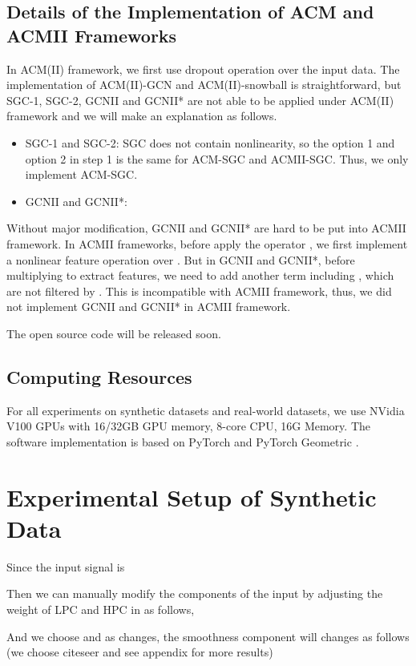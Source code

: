 \documentclass{article}
\newcommand{\0}{{\boldsymbol{0}}}
\newcommand{\6}{{\partial}}
\newcommand{\8}{{\infty}}
\newcommand{\4}{{\nabla}}
\begin{document}
\subsection{Details of the Implementation of ACM and ACMII Frameworks}
\label{appendix:details_implementation_acm_acmII}
In ACM(II) framework, we first use dropout operation over the input data. The implementation of ACM(II)-GCN and ACM(II)-snowball is straightforward, but SGC-1, SGC-2, GCNII and GCNII* are not able to be applied under ACM(II) framework and we will make an explanation as follows.
\begin{itemize}
    \item SGC-1 and SGC-2: SGC does not contain nonlinearity, so the option 1 and option 2 in step 1 is the same for ACM-SGC and ACMII-SGC. Thus, we only implement ACM-SGC.
    \item GCNII and GCNII*: 
    
\end{itemize}
Without major modification, GCNII and GCNII* are hard to be put into ACMII framework. In ACMII frameworks, before apply the operator , we first implement a nonlinear feature operation over . But in GCNII and GCNII*, before multiplying  to extract features, we need to add another term including , which are not filtered by . This is incompatible with ACMII framework, thus, we did not implement GCNII and GCNII* in ACMII framework. 

The open source code will be released soon.

\subsection{Computing Resources}
For all experiments on synthetic datasets and real-world datasets, we use NVidia V100 GPUs with 16/32GB GPU memory, 8-core CPU, 16G Memory. The
software implementation is based on PyTorch and PyTorch Geometric \cite{fey2019fast}.
\clearpage
\iffalse
\section{Experimental Setup of Synthetic Data}
\label{appendix:synthetic_setup}
Since the input signal is 



Then we can manually modify the components of the input by adjusting the weight of LPC and HPC in  as follows,



And we choose  and as  changes, the smoothness component will changes as follows (we choose citeseer and see appendix for more results)
\end{document}
